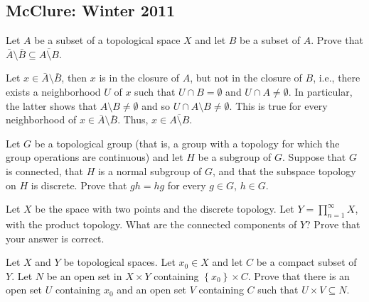 \subsection{McClure: Winter 2011}
\setcounter{exercise}{0}

\begin{problem}
  Let \(A\) be a subset of a topological space \(X\) and let \(B\) be a
  subset of \(A\). Prove that
  \(\bar A\setminus\bar B\subseteq\overline{A\setminus B}\).
\end{problem}
\begin{solution}
  Let \(x\in\bar A\setminus\bar B\), then \(x\) is in the closure of \(A\),
  but not in the closure of \(B\), i.e., there exists a neighborhood \(U\)
  of \(x\) such that \(U\cap B=\emptyset\) and \(U\cap A\neq\emptyset\). In
  particular, the latter shows that \(A\setminus B\neq\emptyset\) and so
  \(U\cap A\setminus B\neq\emptyset\). This is true for every neighborhood
  of \(x\in\bar A\setminus\bar B\). Thus, \(x\in\overline{A\setminus B}\).
\end{solution}

\begin{problem}
  Let \(G\) be a topological group (that is, a group with a topology for
  which the group operations are continuous) and let \(H\) be a subgroup of
  \(G\). Suppose that \(G\) is connected, that \(H\) is a normal subgroup
  of \(G\), and that the subspace topology on \(H\) is discrete. Prove that
  \(g h=hg\) for every \(g\in G\), \(h\in G\).
\end{problem}
\begin{solution}
\end{solution}

\begin{problem}
  Let \(X\) be the space with two points and the discrete topology. Let
  \(Y=\prod_{n=1}^\infty X\), with the product topology. What are the
  connected components of \(Y\)? Prove that your answer is correct.
\end{problem}
\begin{solution}
\end{solution}

\begin{problem}
  Let \(X\) and \(Y\) be topological spaces. Let \(x_0\in X\) and let \(C\)
  be a compact subset of \(Y\). Let \(N\) be an open set in \(X\times Y\)
  containing \(\left\{x_0\right\}\times C\). Prove that there is an open
  set \(U\) containing \(x_0\) and an open set \(V\) containing \(C\) such
  that \(U\times V\subseteq N\).
\end{problem}
\begin{solution}
\end{solution}

